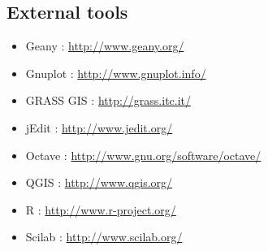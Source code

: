 \subsection{External tools}

\begin{itemize}
  \item Geany : \textcolor{blue}{\url{http://www.geany.org/}}
  \item Gnuplot : \textcolor{blue}{\url{http://www.gnuplot.info/}}
  \item GRASS GIS : \textcolor{blue}{\url{http://grass.itc.it/}}
  \item jEdit : \textcolor{blue}{\url{http://www.jedit.org/}}
  \item Octave : \textcolor{blue}{\url{http://www.gnu.org/software/octave/}}
  \item QGIS : \textcolor{blue}{\url{http://www.qgis.org/}}
  \item R : \textcolor{blue}{\url{http://www.r-project.org/}}
  \item Scilab : \textcolor{blue}{\url{http://www.scilab.org/}} 
\end{itemize}   


